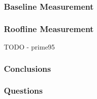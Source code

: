 \documentclass{beamer}
\begin{document}
\begin{frame}[fragile]
\frametitle{Baseline Measurement}
\centering                                                                      
\lstset{basicstyle=\ttfamily\footnotesize\bfseries, frame=tb} %
              
\label{fig:microbench}                                                           
\end{frame}

  \begin{frame}
    \frametitle{Roofline Measurement}
      TODO - prime95
  \end{frame}

  \begin{frame}
    \frametitle{Conclusions}
  \end{frame}
  \begin{frame}
    \frametitle{Questions}
  \end{frame}
\end{document}
